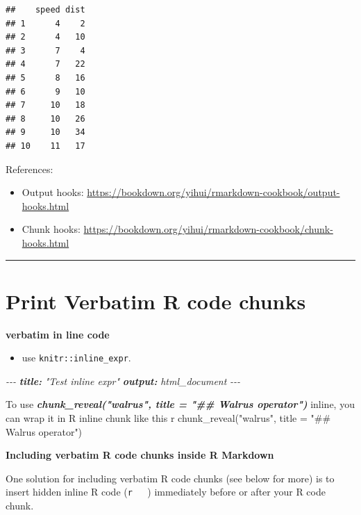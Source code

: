 \documentclass[
  a4paper,
  twoside,
  openright]{book}
\newenvironment{Shaded}{\begin{snugshade}}{\end{snugshade}}
\newcommand{\AnnotationTok}[1]{\textcolor[rgb]{0.56,0.35,0.01}{\textbf{\textit{#1}}}}
\newcommand{\CommentTok}[1]{\textcolor[rgb]{0.56,0.35,0.01}{\textit{#1}}}
\newcommand{\InformationTok}[1]{\textcolor[rgb]{0.56,0.35,0.01}{\textbf{\textit{#1}}}}
\newcommand{\NormalTok}[1]{#1}
\providecommand{\tightlist}{%
  \setlength{\itemsep}{0pt}\setlength{\parskip}{0pt}}
\theoremstyle{definition}
\theoremstyle{definition}
\theoremstyle{definition}
\theoremstyle{definition}
\theoremstyle{remark}
\begin{document}
\begin{verbatim}
##    speed dist
## 1      4    2
## 2      4   10
## 3      7    4
## 4      7   22
## 5      8   16
## 6      9   10
## 7     10   18
## 8     10   26
## 9     10   34
## 10    11   17
\end{verbatim}

References:

\begin{itemize}
\tightlist
\item
  Output hooks: \url{https://bookdown.org/yihui/rmarkdown-cookbook/output-hooks.html}
\item
  Chunk hooks: \url{https://bookdown.org/yihui/rmarkdown-cookbook/chunk-hooks.html}
\end{itemize}

\begin{center}\rule{0.5\linewidth}{0.5pt}\end{center}

\section{Print Verbatim R code chunks}\label{print-verbatim-r-code-chunks}

\textbf{verbatim in line code}

\begin{itemize}
\tightlist
\item
  use \texttt{knitr::inline\_expr}.
\end{itemize}

\begin{Shaded}
\begin{Highlighting}[]
\CommentTok{{-}{-}{-}}
\AnnotationTok{title:}\CommentTok{ "Test inline expr"}
\AnnotationTok{output:}\CommentTok{ html\_document}
\CommentTok{{-}{-}{-}}

\NormalTok{To use }\InformationTok{\textasciigrave{}chunk\_reveal("walrus", title = "\#\# Walrus operator")\textasciigrave{}}\NormalTok{ inline, you can wrap it in R inline chunk like this \textasciigrave{}}\InformationTok{\textasciigrave{} \textasciigrave{}}\NormalTok{r chunk\_reveal("walrus", title = "\#\# Walrus operator")\textasciigrave{} \textasciigrave{}\textasciigrave{}}
\end{Highlighting}
\end{Shaded}

\textbf{Including verbatim R code chunks inside R Markdown}

One solution for including verbatim R code chunks (see below for more) is to insert hidden inline R code (\texttt{\textasciigrave{}r\ \ \ \textquotesingle{}\textquotesingle{}\textasciigrave{}}) immediately before or after your R code chunk.
\end{document}
